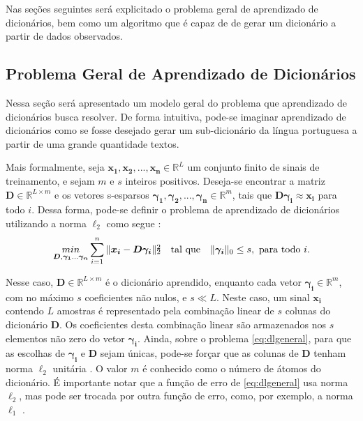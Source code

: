 \documentclass[cic,tc]{iiufrgs}
\def\SPSB#1#2{\rlap{\textsuperscript{#1}}\SB{#2}}
\def\SB#1{\textsubscript{#1}}
\renewcommand{\vec}[1]{\bm{#1}}
\newcommand{\mat}[1]{\bm{#1}}
\begin{document}
Nas seções seguintes será explicitado o problema geral de aprendizado de dicionários, bem como 
um algoritmo que é capaz de de gerar um dicionário a partir de dados observados.

\subsection{Problema Geral de Aprendizado de Dicionários}
Nessa seção será apresentado um modelo geral do problema que aprendizado de dicionários busca resolver.
De forma intuitiva, pode-se imaginar aprendizado de dicionários como se fosse desejado gerar 
um sub-dicionário da língua portuguesa a partir de uma grande quantidade textos.

Mais formalmente, seja $\vec{x_1}, \vec{x_2}, ..., \vec{x_n} \in \mathbb{R}^L$
um conjunto finito de sinais de treinamento, e sejam $m$ e $s$ inteiros positivos.
Deseja-se encontrar a matriz $\mat{D} \in \mathbb{R}^{L\times m}$ e os vetores s-esparsos
$\vec{\gamma_1}, \vec{\gamma_2}, ..., \vec{\gamma_n} \in \mathbb{R}^m$, tais que
$\mat{D}\vec{\gamma_i} \approx \vec{x_i}$ para todo $i$. Dessa forma, pode-se definir o problema
de aprendizado de dicionários utilizando a norma $\ell_2$ como segue  \cite{chen2015compressed}:
\begin{equation}
    \label{eq:dlgeneral}
    \underset{\mat{D}, \vec{\gamma_1}...\vec{\gamma_n}}{min} 
    \sum_{i=1}^{n} {\lVert  \vec{x_i} - \mat{D} \vec{\gamma_i} \rVert \SPSB{2}{2}}
    \hspace{1em} \text{tal que} \hspace{1em}
    \lVert \vec{\gamma_i} \rVert_0 \le s, \text{ para todo } i.
\end{equation}

Nesse caso, $\mat{D} \in \mathbb{R}^{L\times m}$ é o dicionário aprendido, enquanto 
cada vetor $\vec{\gamma_i} \in \mathbb{R}^m$, com no máximo $s$ coeficientes não nulos, 
e $s\ll L$. 
Neste caso, um sinal $\vec{x_i}$ contendo $L$ amostras é representado pela combinação linear de $s$ 
colunas do dicionário $\mat{D}$. 
Os coeficientes desta combinação linear são armazenados nos $s$ elementos não zero 
do vetor $\vec{\gamma_i}$.
Ainda, sobre o problema \eqref{eq:dlgeneral}, para que as escolhas
de $\vec{\gamma_i}$ e $\mat{D}$ sejam únicas, pode-se forçar que as colunas de $\mat{D}$ 
tenham norma $\ell_2$
unitária \cite{chen2015compressed}. O valor $m$ é conhecido como o número de átomos do 
dicionário.
É importante notar que a função de erro de \eqref{eq:dlgeneral} usa norma $\ell_2$, mas pode ser trocada
por outra função de erro, como, por exemplo, a norma $\ell_1$ \cite{chen2015compressed}.
\end{document}
